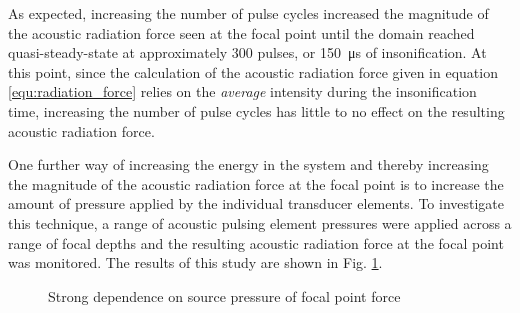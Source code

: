 			As expected, increasing the number of pulse cycles increased the magnitude of the acoustic radiation force seen at the focal point until the domain reached quasi-steady-state at approximately 300 pulses, or \SI{150}{\us} of insonification. At this point, since the calculation of the acoustic radiation force given in equation \ref{equ:radiation_force} relies on the \emph{average} intensity during the insonification time, increasing the number of pulse cycles has little to no effect on the resulting acoustic radiation force.

			One further way of increasing the energy in the system and thereby increasing the magnitude of the acoustic radiation force at the focal point is to increase the amount of pressure applied by the individual transducer elements.  To investigate this technique, a range of acoustic pulsing element pressures were applied across a range of focal depths and the resulting acoustic radiation force at the focal point was monitored. The results of this study are shown in Fig. \ref{fig:pressure_force}.

			\begin{figure}[!htb]
				\centering
				\caption[Strong dependence on source pressure of focal point force]{Strong dependence on source pressure of focal point force}
				\label{fig:pressure_force}
			\end{figure}

